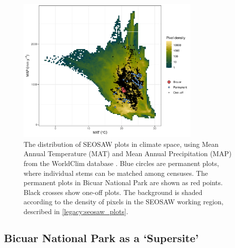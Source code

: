 \begin{refsection}
\begin{figure}[!h]
\centering
	\includegraphics[width=0.8\textwidth]{img/seosaw_clim}
	\caption[Climatic distribution of plots in the SEOSAW network]{The distribution of SEOSAW plots in climate space, using Mean Annual Temperature (MAT) and Mean Annual Precipitation (MAP) from the WorldClim database \citep{Fick2017}. Blue circles are permanent plots, where individual stems can be matched among censuses. The permanent plots in Bicuar National Park are shown as red points. Black crosses show one-off plots. The background is shaded according to the density of pixels in the SEOSAW working region, described in \autoref{legacy:seosaw_plots}.}
	\label{legacy:seosaw_clim}
\end{figure}

\subsection{Bicuar National Park as a `Supersite'}
\label{legacy:ssec:supersite}


\end{refsection}
